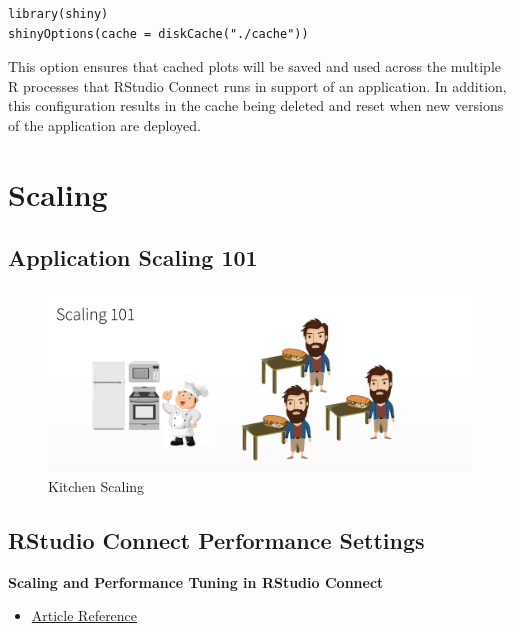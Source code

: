 \documentclass[]{book}
\providecommand{\tightlist}{%
  \setlength{\itemsep}{0pt}\setlength{\parskip}{0pt}}
\theoremstyle{definition}
\theoremstyle{definition}
\theoremstyle{definition}
\theoremstyle{remark}
\begin{document}
\begin{verbatim}
library(shiny)
shinyOptions(cache = diskCache("./cache"))
\end{verbatim}

This option ensures that cached plots will be saved and used across the
multiple R processes that RStudio Connect runs in support of an
application. In addition, this configuration results in the cache being
deleted and reset when new versions of the application are deployed.

\hypertarget{scaling}{%
\chapter{Scaling}\label{scaling}}

\hypertarget{application-scaling-101}{%
\section{Application Scaling 101}\label{application-scaling-101}}

\begin{figure}
\centering
\includegraphics{imgs/scaling/kitchen-scaling.png}
\caption{Kitchen Scaling}
\end{figure}

\hypertarget{rstudio-connect-performance-settings}{%
\section{RStudio Connect Performance
Settings}\label{rstudio-connect-performance-settings}}

\textbf{Scaling and Performance Tuning in RStudio Connect}

\begin{itemize}
\tightlist
\item
  \href{https://support.rstudio.com/hc/en-us/articles/231874748-scaling-and-performance-tuning-rstudio-connect}{Article
  Reference}
\end{itemize}
\end{document}
